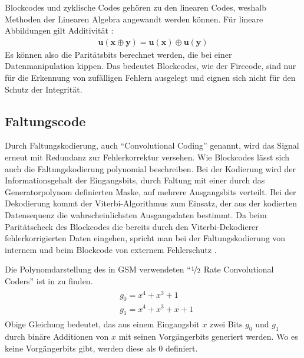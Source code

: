 Blockcodes und zyklische Codes gehören zu den linearen Codes, weshalb Methoden der Linearen Algebra angewandt werden können. Für lineare Abbildungen gilt Additivität \citep[S. 142 ff.]{werner2008codierung}:
\begin{align}
\boldsymbol{u}(\boldsymbol{x} \oplus \boldsymbol{y}) = \boldsymbol{u}(\boldsymbol{x}) \oplus \boldsymbol{u}(\boldsymbol{y}) \label{gl:fire-lin}
\end{align}
Es können also die Paritätsbits berechnet werden, die bei einer Datenmanipulation kippen. Das bedeutet Blockcodes, wie der Firecode, sind nur für die Erkennung von zufälligen Fehlern ausgelegt und eignen sich nicht für den Schutz der Integrität.

\subsection{Faltungscode}\label{hdl:conv-code}

Durch Faltungskodierung, auch "`Convolutional Coding"' genannt, wird das Signal erneut mit Redundanz zur Fehlerkorrektur versehen. Wie Blockcodes lässt sich auch die Faltungskodierung polynomial beschreiben. Bei der Kodierung wird der Informationsgehalt der Eingangsbits, durch Faltung mit einer durch das Generatorpolynom definierten Maske, auf mehrere Ausgangsbits verteilt. Bei der Dekodierung kommt der Viterbi-Algorithmus zum Einsatz, der aus der kodierten Datensequenz die wahrscheinlichsten Ausgangsdaten bestimmt. Da beim Paritätscheck des Blockcodes die bereits durch den Viterbi-Dekodierer fehlerkorrigierten Daten eingehen, spricht man bei der Faltungskodierung von internem und beim Blockcode von externem Fehlerschutz \cite[Kap. 4.8.1, 4.8.2]{eberspacher:2008:gsm-architecture}.

Die Polynomdarstellung des in \ac{GSM} verwendeten "`$\nicefrac{1}{2}$ Rate Convolutional Coders"' ist in  zu finden.
\begin{align}
\begin{split}
& g_0 = x^4 + x^3 + 1 \\
& g_1 = x^4 + x^3 + x + 1
\end{split}
\end{align}
Obige Gleichung bedeutet, das aus einem Eingangsbit $x$ zwei Bits $g_0$ und $g_1$ durch binäre Additionen von $x$ mit seinen Vorgängerbits generiert werden. Wo es keine Vorgängerbits gibt, werden diese als 0 definiert.

